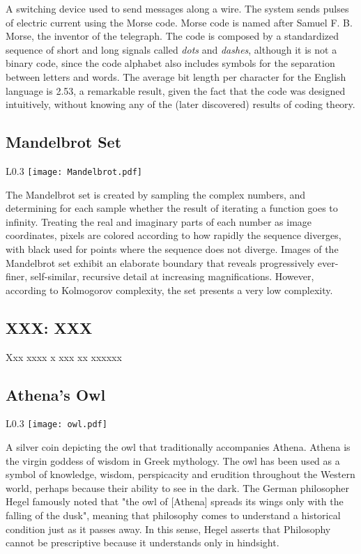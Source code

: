 A switching device used to send messages along a wire. The system sends pulses of electric current using the Morse code. Morse code is named after Samuel F. B. Morse, the inventor of the telegraph. The code is composed by a standardized sequence of short and long signals called \emph{dots} and \emph{dashes}, although it is not a binary code, since the code alphabet also includes symbols for the separation between letters and words. The average bit length per character for the English language is 2.53, a remarkable result, given the fact that the code was designed intuitively, without knowing any of the (later discovered) results of coding theory.

\subsection* {Mandelbrot Set}

\begin{wrapfigure}{L}{0.3\textwidth}
\centering
\texttt{[image: Mandelbrot.pdf]}
\end{wrapfigure}

The Mandelbrot set is created by sampling the complex numbers, and determining for each sample whether the result of iterating a function goes to infinity. Treating the real and imaginary parts of each number as image coordinates, pixels are colored according to how rapidly the sequence diverges, with black used for points where the sequence does not diverge. Images of the Mandelbrot set exhibit an elaborate boundary that reveals progressively ever-finer, self-similar, recursive detail at increasing magnifications. However, according to Kolmogorov complexity, the set presents a very low complexity.

\subsection* {XXX: XXX}

Xxx xxxx x xxx xx xxxxxx

\subsection* {Athena's Owl}

\begin{wrapfigure}{L}{0.3\textwidth}
\centering
\texttt{[image: owl.pdf]}
\end{wrapfigure}

A silver coin depicting the owl that traditionally accompanies Athena. Athena is the virgin goddess of wisdom in Greek mythology. The owl has been used as a symbol of knowledge, wisdom, perspicacity and erudition throughout the Western world, perhaps because their ability to see in the dark. The German philosopher Hegel famously noted that "the owl of [Athena] spreads its wings only with the falling of the dusk", meaning that philosophy comes to understand a historical condition just as it passes away. In this sense, Hegel asserts that Philosophy cannot be prescriptive because it understands only in hindsight.

